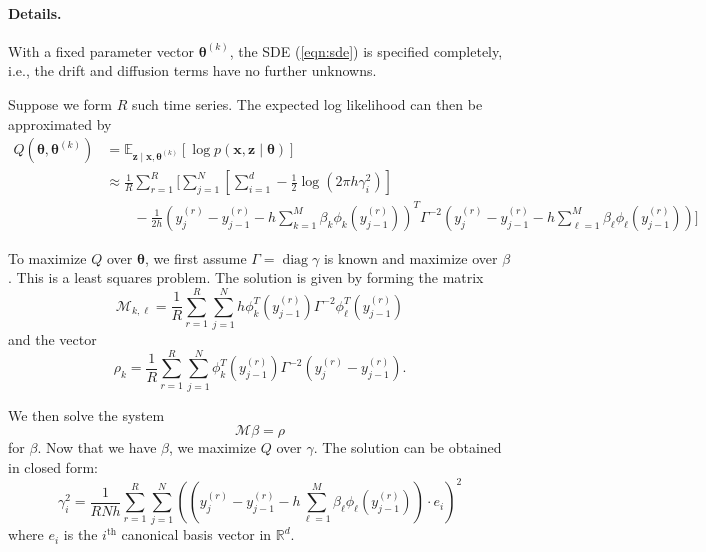 \documentclass{article}
\newcommand{\btheta}{\ensuremath{\bm{\theta}}}
\newcommand{\opdiag}{\ensuremath{\operatorname{diag}}}
\newcommand{\bx}{\ensuremath{\mathbf{x}}}
\newcommand{\bz}{\ensuremath{\mathbf{z}}}
\begin{document}
\paragraph{Details.} With a fixed parameter vector $\btheta^{(k)}$, the SDE (\ref{eqn:sde}) is specified completely, i.e., the drift and diffusion terms have no further unknowns.  


Suppose we form $R$ such time series.  The expected log likelihood can then be approximated by
\begin{align*}
Q(\btheta, \btheta^{(k)}) &= \mathbb{E}_{\bz \mid \bx, \btheta^{(k)}} [\log p(\bx, \bz \mid \btheta)] \\
 &\approx \frac{1}{R} \sum_{r=1}^R \biggl[ \sum_{j=1}^N \left[ \sum_{i=1}^d -\frac{1}{2} \log (2 \pi h \gamma_i^2) \right] \\
 &\qquad -\frac{1}{2h} (y_j^{(r)} - y_{j-1}^{(r)} - h \sum_{k=1}^M \beta_k \phi_k(y_{j-1}^{(r)}))^T \Gamma^{-2} (y_j^{(r)} - y_{j-1}^{(r)} - h \sum_{\ell=1}^M \beta_\ell \phi_\ell(y_{j-1}^{(r)}) ) \biggr] 
\end{align*}

To maximize $Q$ over $\btheta$, we first assume $\Gamma = \opdiag \gamma$ is known and maximize over $\beta$.  This is a least squares problem.  The solution is given by forming the matrix
$$
\mathcal{M}_{k,\ell} = \frac{1}{R} \sum_{r=1}^{R} \sum_{j=1}^N h \phi_k^T (y_{j-1}^{(r)}) \Gamma^{-2} \phi_\ell^T (y_{j-1}^{(r)})
$$
and the vector
$$
\rho_k = \frac{1}{R} \sum_{r=1}^{R} \sum_{j=1}^N \phi_k^T (y_{j-1}^{(r)}) \Gamma^{-2} (y_j^{(r)} - y_{j-1}^{(r)}).
$$

We then solve the system
$$
\mathcal{M} \beta = \rho
$$
for $\beta$.  Now that we have $\beta$, we maximize $Q$ over $\gamma$.  The solution can be obtained in closed form:
$$
\gamma_i^2 = \frac{1}{R N h} \sum_{r=1}^{R} \sum_{j=1}^N (( y_j^{(r)} - y_{j-1}^{(r)} - h \sum_{\ell=1}^M \beta_\ell \phi_\ell (y_{j-1}^{(r)}) ) \cdot e_i )^2
$$
where $e_i$ is the $i^\text{th}$ canonical basis vector in $\mathbb{R}^d$.
\end{document}
